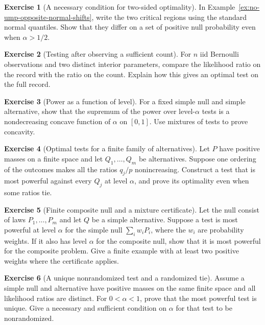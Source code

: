 \documentclass[11pt,oneside]{book}
\theoremstyle{definition}
\newtheorem{exercise}{Exercise}[section]
\theoremstyle{remark}
\begin{document}
\begin{exercise}[A necessary condition for two-sided optimality]
\label{exer:np-two-sided-uniqueness}
In Example~\ref{ex:no-ump-opposite-normal-shifts}, write the two
critical regions using the standard normal quantiles. Show
that they differ on a set of positive null probability even
when $\alpha>1/2$.
\end{exercise}

\begin{exercise}[Testing after observing a sufficient count]
\label{exer:np-full-vs-count}
For $n$ iid Bernoulli observations and two distinct interior
parameters, compare the likelihood ratio on the record with
the ratio on the count. Explain how this gives an optimal
test on the full record.
\end{exercise}

\begin{exercise}[Power as a function of level]
\label{exer:np-power-concavity}
For a fixed simple null and simple alternative, show that
the supremum of the power over level-$\alpha$ tests is a
nondecreasing concave function of $\alpha$ on $[0,1]$.
Use mixtures of tests to prove concavity.
\end{exercise}

\begin{exercise}[Optimal tests for a finite family of alternatives]
\label{exer:np-finite-common-order}
Let $P$ have positive masses on a finite space and let
$Q_1,\ldots,Q_m$ be alternatives. Suppose one ordering of the
outcomes makes all the ratios $q_j/p$ nonincreasing. Construct
a test that is most powerful against every $Q_j$ at level
$\alpha$, and prove its optimality even when some ratios tie.
\end{exercise}

\begin{exercise}[Finite composite null and a mixture certificate]
\label{exer:np-null-mixture-certificate}
Let the null consist of laws $P_1,\ldots,P_m$ and let $Q$
be a simple alternative. Suppose a test is most powerful at
level $\alpha$ for the simple null $\sum_i w_iP_i$, where
the $w_i$ are probability weights. If it also has level
$\alpha$ for the composite null, show that it is most powerful
for the composite problem. Give a finite example with at least
two positive weights where the certificate applies.
\end{exercise}

\begin{exercise}[A unique nonrandomized test and a randomized tie]
\label{exer:np-finite-uniqueness}
Assume a simple null and alternative have positive masses
on the same finite space and all likelihood ratios are distinct.
For $0<\alpha<1$, prove that the most powerful test is unique.
Give a necessary and sufficient condition on $\alpha$ for that
test to be nonrandomized.
\end{exercise}
\end{document}
